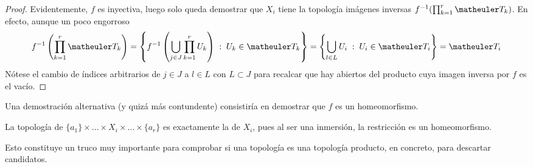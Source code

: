 \begin{proof}
	Evidentemente, $f$ es inyectiva, luego solo queda demostrar que $X_i$ tiene la topología imágenes inversas $f^{-1}(\prod_{k=1}^r\T_k)$. En efecto, aunque un poco engorroso
	\begin{equation*}
	f^{-1}\left(\prod_{k=1}^r\T_k\right)=\left\{f^{-1}\left(\bigcup_{j\in J}\prod_{k=1}^r U_k\right)\midc U_k\in\T_k\right\}=\left\{\bigcup_{l\in L}U_i\midc U_i\in\T_i\right\}=\T_i
	\end{equation*}
	Nótese el cambio de índices arbitrarios de $j\in J$ a $l\in L$ con $L\subset J$ para recalcar que hay abiertos del producto cuya imagen inversa por $f$ es el vacío. 
\end{proof}
Una demostración alternativa (y quizá más contundente) consistiría en demostrar que $f$ es un homeomorfismo.
\begin{obs}[Consecuencias]
	La topología de $\{a_1\}\times\dots\times X_i \times \dots \times\{a_r\}$ es exactamente la de $X_i$, pues al ser una inmersión, la restricción es un homeomorfismo.
	
	Esto constituye un truco muy importante para comprobar si una topología es una topología producto, en concreto, para descartar candidatos.
\end{obs}

